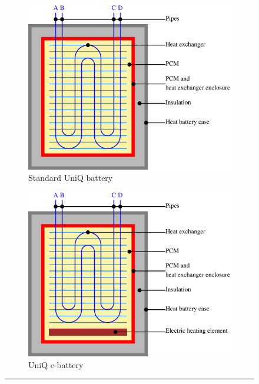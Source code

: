 \begin{figure}[htbp]
	\centering
	\begin{subfigure}{.48\textwidth}
		\centering
		\includegraphics[width=\textwidth]{figures/UniQ_std_cross-section.eps}
		\caption{Standard UniQ battery}
		\label{fig:uniq_cross-section}
	\end{subfigure}
	\begin{subfigure}{.48\textwidth}
		\centering
		\includegraphics[width=\textwidth]{figures/eUniQ_cross-section.eps}
		\caption{UniQ e-battery}
		\label{fig:euniq_cross-section}
	\end{subfigure}
	\rule{\textwidth}{0.5pt} %
	\caption{}
	\label{fig:cross-sections}
\end{figure}


